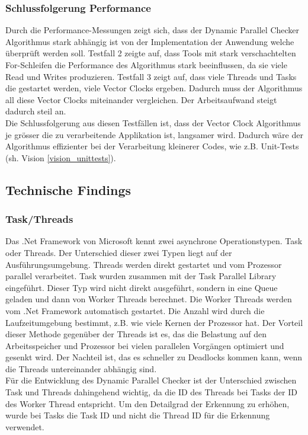 \documentclass[10pt,a4paper]{article}
\begin{document}
\subsubsection{Schlussfolgerung Performance}
Durch die Performance-Messungen zeigt sich, dass der Dynamic Parallel Checker Algorithmus stark abhängig ist von der Implementation der Anwendung welche überprüft werden soll. Testfall 2 zeigte auf, dass Tools mit stark verschachtelten For-Schleifen die Performance des Algorithmus stark beeinflussen, da sie viele Read und Writes produzieren. Testfall 3 zeigt auf, dass viele Threads und Tasks die gestartet werden, viele Vector Clocks ergeben. Dadurch muss der Algorithmus all diese Vector Clocks miteinander vergleichen. Der Arbeitsaufwand steigt dadurch steil an.\\
Die Schlussfolgerung aus diesen Testfällen ist, dass der Vector Clock Algorithmus je grösser die zu verarbeitende Applikation ist, langsamer wird. Dadurch wäre der Algorithmus effizienter bei der Verarbeitung kleinerer Codes, wie z.B. Unit-Tests (sh. Vision \ref{vision_unittests}).
\subsection{Technische Findings}
\subsubsection{Task/Threads}\label{chapter_taskthread}
Das .Net Framework von Microsoft kennt zwei asynchrone Operationstypen. Task oder Threads. Der Unterschied dieser zwei Typen liegt auf der Ausführungsumgebung. Threads werden direkt gestartet und vom Prozessor parallel verarbeitet. Task wurden zusammen mit der Task Parallel Library eingeführt. Dieser Typ wird nicht direkt ausgeführt, sondern in eine Queue geladen und dann von Worker Threads berechnet. Die Worker Threads werden vom .Net Framework automatisch gestartet. Die Anzahl wird durch die Laufzeitumgebung bestimmt, z.B. wie viele Kernen der Prozessor hat. Der Vorteil dieser Methode gegenüber der Threads ist es, das die Belastung auf den Arbeitsspeicher und Prozessor bei vielen parallelen Vorgängen optimiert und gesenkt wird. Der Nachteil ist, das es schneller zu Deadlocks kommen kann, wenn die Threads untereinander abhängig sind.\\
Für die Entwicklung des Dynamic Parallel Checker ist der Unterschied zwischen Task und Threads dahingehend wichtig, da die ID des Threads bei Tasks der ID des Worker Thread entspricht. Um den Detailgrad der Erkennung zu erhöhen, wurde bei Tasks die Task ID und nicht die Thread ID für die Erkennung verwendet.
\end{document}
